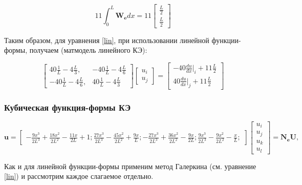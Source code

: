 $$
11\int_0^L \mathbf{W_e} d x= 11
\begin{bmatrix}
	\frac{L}{2} \\
	\frac{L}{2}
\end{bmatrix}
$$


Таким образом, для уравнения \ref{lin}, при использовании линейной функции-формы,  получаем (матмодель линейного КЭ):

$$
\begin{bmatrix}
	40\frac{1}{L}    -4 \frac{L}{3}  , &   -40 \frac{1}{L}    -4 \frac{L}{6}   \\
	  -40  \frac{1}{L}    -4 \frac{L}{6}  , &  40\frac{1}{L}    -4 \frac{L}{3}  
\end{bmatrix}
\begin{bmatrix}
	u_i \\
	u_j
\end{bmatrix}=
\begin{bmatrix}
	  -40 \frac{du}{dx}|_i   +11 \frac{L}{2} \\
	40\frac{du}{dx}|_j   +11 \frac{L}{2} 
\end{bmatrix}
$$


\subsubsection{Кубическая функция-формы КЭ}
$$
\mathbf{u}=\begin{bmatrix}
-\frac{9x^3}{2L^3}+\frac{18x^2}{2L^2}-\frac{11x}{2L} + 1;
\frac{27x^3}{2L^3}-\frac{45x^2}{2L^2}+\frac{9x}{L};
-\frac{27x^3}{2L^3}+\frac{36x^2}{2L^2}-\frac{9x}{2L};
\frac{9x^3}{2L^3}-\frac{9x^2}{2L^2}-\frac{x}{L};
\end{bmatrix}
\begin{bmatrix}
u_i \\
u_j\\
u_k\\
u_l
\end{bmatrix}
=\mathbf{N_eU},
$$

Как и для линейной функции-формы применим метод Галеркина (см. уравнение \ref{lin}) и рассмотрим каждое слагаемое отдельно.

